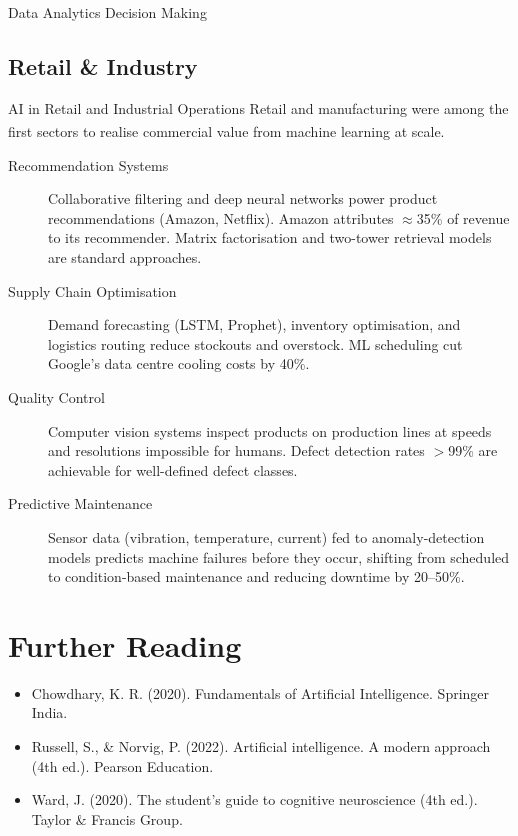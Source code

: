 \begin{v3topic}{Data Analytics Decision Making}
    \subsection{Retail \& Industry}

\begin{v3topic}{AI in Retail and Industrial Operations}
        Retail and manufacturing were among the first sectors to realise commercial value from machine learning at scale.\textsuperscript{\cite{adjaouteAI2024}}

        \begin{description}
            \item[Recommendation Systems] Collaborative filtering and deep neural networks power product recommendations (Amazon, Netflix). Amazon attributes $\approx$35\% of revenue to its recommender. Matrix factorisation and two-tower retrieval models are standard approaches.
            \item[Supply Chain Optimisation] Demand forecasting (LSTM, Prophet), inventory optimisation, and logistics routing reduce stockouts and overstock. ML scheduling cut Google's data centre cooling costs by 40\%.
            \item[Quality Control] Computer vision systems inspect products on production lines at speeds and resolutions impossible for humans. Defect detection rates $>$99\% are achievable for well-defined defect classes.
            \item[Predictive Maintenance] Sensor data (vibration, temperature, current) fed to anomaly-detection models predicts machine failures before they occur, shifting from scheduled to condition-based maintenance and reducing downtime by 20--50\%.
        \end{description}
\end{v3topic}

    \section{Further Reading}
    \begin{itemize}
        \item Chowdhary, K. R. (2020). Fundamentals of Artificial Intelligence. Springer India.
        \item Russell, S., \& Norvig, P. (2022). Artificial intelligence. A modern approach (4th ed.). Pearson Education.
        \item Ward, J. (2020). The student's guide to cognitive neuroscience (4th ed.). Taylor \& Francis Group.
    \end{itemize}
\end{v3topic}


